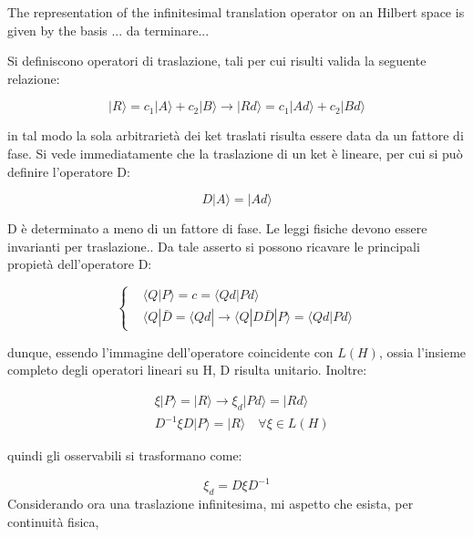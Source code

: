\documentclass{article}
\begin{document}
The representation of the infinitesimal translation operator on an Hilbert space is given by
the basis
... da terminare...



Si definiscono operatori di traslazione, tali per cui risulti valida la seguente relazione:

\begin{equation}
  |R\rangle =c_1|A\rangle +c_2|B\rangle  \rightarrow |Rd\rangle =c_1|Ad\rangle +c_2|Bd\rangle
\end{equation}

in tal modo la sola arbitrarietà dei ket traslati risulta essere data da un fattore di fase.
Si vede immediatamente che la traslazione di un ket è lineare, per cui si può definire l'operatore D:

\begin{equation}
  D|A\rangle =|Ad\rangle
\end{equation}

D è determinato a meno di un fattore di fase.
Le leggi fisiche devono essere invarianti per traslazione..
Da tale asserto si possono ricavare le principali propietà dell'operatore D:

\begin{equation}
  \left\{
  \begin{aligned}
     & \langle Q |P\rangle =c=\langle Qd|Pd\rangle                                                     \\
     & \langle Q |\bar{D}= \langle Qd| \rightarrow \langle Q |D \bar{D}|P\rangle =\langle Qd|Pd\rangle
  \end{aligned}
  \right.
\end{equation}

dunque, essendo l'immagine dell'operatore coincidente con $L(H)$, ossia l'insieme completo degli operatori
lineari su H, D risulta unitario.
Inoltre:

\begin{equation}
  \begin{aligned}
     & \xi |P\rangle =|R\rangle  \rightarrow \xi_d |Pd\rangle = |Rd\rangle \\
     & D^{-1}\xi D |P\rangle = |R\rangle  \quad \forall  \xi \in L(H)
  \end{aligned}
\end{equation}

quindi gli osservabili si trasformano come:

\begin{equation}
  \xi_d = D \xi D^{-1}
\end{equation}
Considerando ora una traslazione infinitesima, mi aspetto che esista, per continuità fisica,
\end{document}
